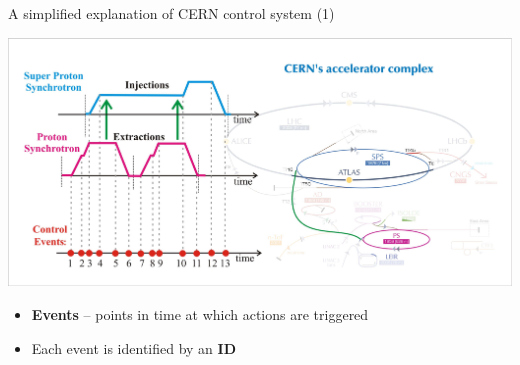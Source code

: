 \documentclass[compress,red]{beamer}
\begin{document}
\begin{frame}{A simplified explanation of CERN control system (1)}

      \begin{center}
      \includegraphics[width=1.0\textwidth]{applications/CERN/event1.pdf}
      \end{center}

  \begin{itemize}
    \item {\bf Events} -- points in time at which actions are triggered
    \item Each event is identified by an {\bf ID}
  \end{itemize}

\end{frame}
\end{document}
